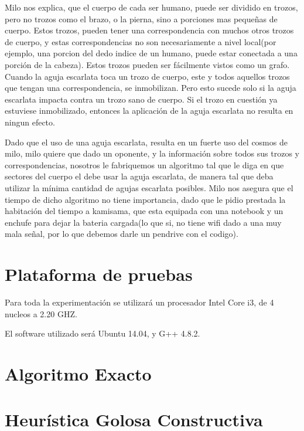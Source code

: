 \documentclass[a4paper]{article}
\begin{document}
\begin{enumerate}
Milo nos explica, que el cuerpo de cada ser humano, puede ser dividido en trozos, pero no trozos como el brazo, o la pierna, sino a porciones mas pequeñas de cuerpo. Estos trozos, pueden tener una correspondencia con muchos otros trozos de cuerpo, y estas correspondencias no son necesariamente a nivel local(por ejemplo, una porcion del dedo indice de un humano, puede estar conectada a una porción de la cabeza). Estos trozos pueden ser fácilmente vistos como un grafo. Cuando la aguja escarlata toca un trozo de cuerpo, este y todos aquellos trozos que tengan una correspondencia, se inmobilizan. Pero esto sucede solo si la aguja escarlata impacta contra un trozo sano de cuerpo. Si el trozo en cuestión ya estuviese inmobilizado, entonces la aplicación de la aguja escarlata no resulta en ningun efecto.

Dado que el uso de una aguja escarlata, resulta en un fuerte uso del cosmos de milo, milo quiere que dado un oponente, y la información sobre todos sus trozos y correspondencias, nosotros le fabriquemos un algoritmo tal que le diga en que sectores del cuerpo el debe usar la aguja escarlata, de manera tal que deba utilizar la mínima cantidad de agujas escarlata posibles. Milo nos asegura que el tiempo de dicho algoritmo no tiene importancia, dado que le pidio prestada la habitación del tiempo a kamisama, que esta equipada con una notebook y un enchufe para dejar la bateria cargada(lo que si, no tiene wifi dado a una muy mala señal, por lo que debemos darle un pendrive con el codigo).


\end{enumerate} 

\section{Plataforma de pruebas}

Para toda la experimentación se utilizará un procesador Intel Core i3, de 4 nucleos a 2.20 GHZ.

El software utilizado será Ubuntu 14.04, y G++ 4.8.2.
\newpage
\section{Algoritmo Exacto}


\newpage
\section{Heurística Golosa Constructiva}

\end{document}
